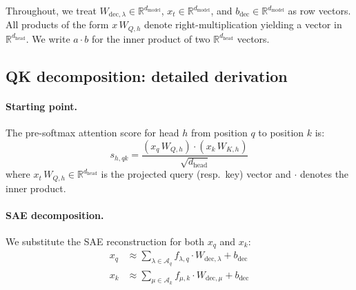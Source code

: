 \documentclass{article}
\theoremstyle{plain}
\theoremstyle{definition}
\theoremstyle{remark}
\newcommand{\dmodel}{d_{\mathrm{model}}}
\newcommand{\dhead}{d_{\mathrm{head}}}
\newcommand{\RR}{\mathbb{R}}
\begin{document}
Throughout, we treat $W_{\mathrm{dec},\lambda} \in \RR^{\dmodel}$, $x_t \in \RR^{\dmodel}$, and $b_{\mathrm{dec}} \in \RR^{\dmodel}$ as row vectors. All products of the form $x\,W_{Q,h}$ denote right-multiplication yielding a vector in $\RR^{\dhead}$. We write $a \cdot b$ for the inner product of two $\RR^{\dhead}$ vectors.

\subsection{QK decomposition: detailed derivation}
\label{app:qk_derivation}

\paragraph{Starting point.} The pre-softmax attention score for head $h$ from position $q$ to position $k$ is:
\begin{equation}
    s_{h,qk} = \frac{\left(x_q\,W_{Q,h}\right) \cdot \left(x_k\,W_{K,h}\right)}{\sqrt{\dhead}}
\end{equation}
where $x_t\,W_{Q,h} \in \RR^{\dhead}$ is the projected query (resp.\ key) vector and $\cdot$ denotes the inner product.

\paragraph{SAE decomposition.} We substitute the SAE reconstruction for both $x_q$ and $x_k$:
\begin{align}
    x_q &\approx \sum_{\lambda \in \mathcal{A}_q} f_{\lambda,q} \cdot W_{\mathrm{dec},\lambda} + b_{\mathrm{dec}} \\
    x_k &\approx \sum_{\mu \in \mathcal{A}_k} f_{\mu,k} \cdot W_{\mathrm{dec},\mu} + b_{\mathrm{dec}}
\end{align}
\end{document}
